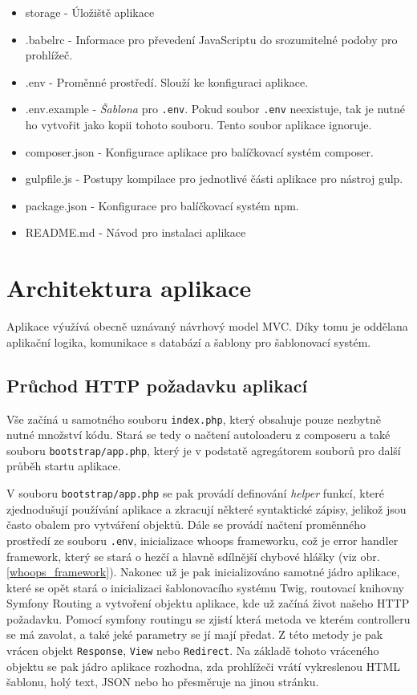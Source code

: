\documentclass[12pt, a4paper]{article}
\newcommand{\img}[1]{(viz obr. \ref{#1})}
\begin{document}
\begin{itemize}
    	\item storage - Úložiště aplikace
    	\item .babelrc - Informace pro převedení JavaScriptu do srozumitelné podoby pro prohlížeč.
    	\item .env - Proměnné prostředí. Slouží ke konfiguraci aplikace.
    	\item .env.example - {\it Šablona} pro {\tt .env}. Pokud soubor {\tt .env} neexistuje, tak je nutné ho vytvořit jako kopii tohoto souboru. Tento soubor aplikace ignoruje.
    	\item composer.json - Konfigurace aplikace pro balíčkovací systém composer.
    	\item gulpfile.js - Postupy kompilace pro jednotlivé části aplikace pro nástroj gulp.
    	\item package.json - Konfigurace pro balíčkovací systém npm.
    	\item README.md - Návod pro instalaci aplikace
    \end{itemize}

    \section{Architektura aplikace}
    Aplikace výužívá obecně uznávaný návrhový model MVC. Díky tomu je oddělana aplikační logika, komunikace s databází a šablony pro šablonovací systém.

    \subsection{Průchod HTTP požadavku aplikací}
    Vše začíná u samotného souboru {\tt index.php}, který obsahuje pouze nezbytně nutné množství kódu. Stará se tedy o načtení autoloaderu z composeru a také souboru {\tt bootstrap/app.php}, který je v podstatě agregátorem souborů pro další průběh startu aplikace.

    V souboru {\tt bootstrap/app.php} se pak provádí definování {\it helper} funkcí, které zjednodušují používání aplikace a zkracují některé syntaktické zápisy, jelikož jsou často obalem pro vytváření objektů. Dále se provádí načtení proměnného prostředí ze souboru {\tt .env}, inicializace whoops frameworku, což je error handler framework, který se stará o hezčí a hlavně sdílnější chybové hlášky \img{whoops_framework}. Nakonec už je pak inicializováno samotné jádro aplikace, které se opět stará o inicializaci šablonovacího systému Twig, routovací knihovny Symfony Routing a vytvoření objektu aplikace, kde už začíná  život našeho HTTP požadavku. Pomocí symfony routingu se zjistí která metoda ve kterém controlleru se má zavolat, a také jeké parametry se jí mají předat. Z této metody je pak vrácen objekt {\tt Response}, {\tt View} nebo {\tt Redirect}. Na základě tohoto vráceného objektu se pak jádro aplikace rozhodna, zda prohlížeči vrátí vykreslenou HTML šablonu, holý text, JSON nebo ho přesměruje na jinou stránku.
\end{document}
